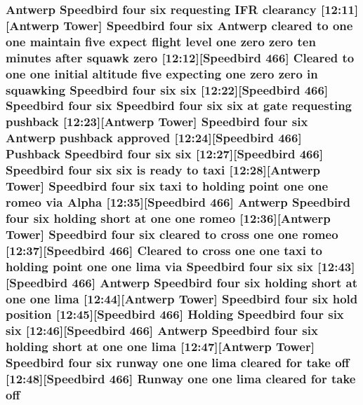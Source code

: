 \subsubsection[{\texorpdfstring{off}{off}}]{\setlength{\rightskip}{0pt plus 5cm}Antwerp Speedbird four {\bf six} requesting I\+FR clearancy \mbox{[}12\+:11\mbox{]}\mbox{[}Antwerp {\bf Tower}\mbox{]} Speedbird four {\bf six} Antwerp cleared to {\bf one} {\bf one} maintain five expect flight level {\bf one} {\bf zero} {\bf zero} {\bf ten} minutes after squawk {\bf zero} \mbox{[}12\+:12\mbox{]}\mbox{[}Speedbird 466\mbox{]} Cleared to {\bf one} {\bf one} initial altitude five expecting {\bf one} {\bf zero} {\bf zero} in {\bf squawking} Speedbird four {\bf six} {\bf six} \mbox{[}12\+:22\mbox{]}\mbox{[}Speedbird 466\mbox{]} Speedbird four {\bf six} Speedbird four {\bf six} {\bf six} at gate requesting pushback \mbox{[}12\+:23\mbox{]}\mbox{[}Antwerp {\bf Tower}\mbox{]} Speedbird four {\bf six} Antwerp pushback {\bf approved} \mbox{[}12\+:24\mbox{]}\mbox{[}Speedbird 466\mbox{]} Pushback Speedbird four {\bf six} {\bf six} \mbox{[}12\+:27\mbox{]}\mbox{[}Speedbird 466\mbox{]} Speedbird four {\bf six} {\bf six} is ready to taxi \mbox{[}12\+:28\mbox{]}\mbox{[}Antwerp {\bf Tower}\mbox{]} Speedbird four {\bf six} taxi to holding point {\bf one} {\bf one} {\bf romeo} via {\bf Alpha} \mbox{[}12\+:35\mbox{]}\mbox{[}Speedbird 466\mbox{]} Antwerp Speedbird four {\bf six} holding short at {\bf one} {\bf one} {\bf romeo} \mbox{[}12\+:36\mbox{]}\mbox{[}Antwerp {\bf Tower}\mbox{]} Speedbird four {\bf six} cleared to cross {\bf one} {\bf one} {\bf romeo} \mbox{[}12\+:37\mbox{]}\mbox{[}Speedbird 466\mbox{]} Cleared to cross {\bf one} {\bf one} taxi to holding point {\bf one} {\bf one} {\bf lima} via Speedbird four {\bf six} {\bf six} \mbox{[}12\+:43\mbox{]}\mbox{[}Speedbird 466\mbox{]} Antwerp Speedbird four {\bf six} holding short at {\bf one} {\bf one} {\bf lima} \mbox{[}12\+:44\mbox{]}\mbox{[}Antwerp {\bf Tower}\mbox{]} Speedbird four {\bf six} hold {\bf position} \mbox{[}12\+:45\mbox{]}\mbox{[}Speedbird 466\mbox{]} Holding Speedbird four {\bf six} {\bf six} \mbox{[}12\+:46\mbox{]}\mbox{[}Speedbird 466\mbox{]} Antwerp Speedbird four {\bf six} holding short at {\bf one} {\bf one} {\bf lima} \mbox{[}12\+:47\mbox{]}\mbox{[}Antwerp {\bf Tower}\mbox{]} Speedbird four {\bf six} runway {\bf one} {\bf one} {\bf lima} cleared for take off \mbox{[}12\+:48\mbox{]}\mbox{[}Speedbird 466\mbox{]} {\bf Runway} {\bf one} {\bf one} {\bf lima} cleared for take off}\hypertarget{happyDay4ExpectedATC_8txt_a29c691e3d615c36339c8fd5f44a0cff1}{}\label{happyDay4ExpectedATC_8txt_a29c691e3d615c36339c8fd5f44a0cff1}
